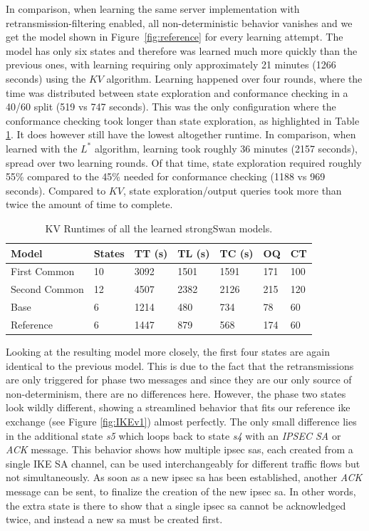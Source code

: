 In comparison, when learning the same server implementation with retransmission-filtering enabled, all non-deterministic behavior vanishes and we get the model shown in Figure~\ref{fig:reference} for every learning attempt. The model has only six states and therefore was learned much more quickly than the previous ones, with learning requiring only approximately 21 minutes (1266 seconds) using the $KV$ algorithm. Learning happened over four rounds, where the time was distributed between state exploration and conformance checking in a 40/60 split (519 vs 747 seconds). This was the only configuration where the conformance checking took longer than state exploration, as highlighted in Table \ref{tab:runtime_summary_kv}. It does however still have the lowest altogether runtime. In comparison, when learned with the $L^*$ algorithm, learning took roughly 36 minutes (2157 seconds), spread over two learning rounds. Of that time, state exploration required roughly 55\% compared to the 45\% needed for conformance checking (1188 vs 969 seconds). Compared to $KV$, state exploration/output queries took more than twice the amount of time to complete.

\begin{table}[h]
	\centering
	\begin{tabular}{|l|l|l|l|l|l|l|}
		\hline
		\rowcolor[HTML]{C0C0C0} 
		Model     		& States & TT (s)  & TL (s)  & TC (s)  & OQ  & CT  \\ \hline
		First Common 	& 10     & 3092 & 1501 & 1591 & 171 & 100 \\ \hline
		Second Common  	& 12     & 4507 & 2382 & 2126 & 215 & 120 \\ \hline
		Base      		& 6      & 1214 & 480  & 734  & 78  & 60  \\ \hline
		Reference 		& 6      & 1447 & 879  & 568  & 174 & 60  \\ \hline
	\end{tabular}
	\caption{KV Runtimes of all the learned strongSwan models.}
	\label{tab:runtime_summary_kv}
\end{table}

Looking at the resulting model more closely, the first four states are again identical to the previous model. This is due to the fact that the retransmissions are only triggered for phase two messages and since they are our only source of non-determinism, there are no differences here. However, the phase two states look wildly different, showing a streamlined behavior that fits our reference \ac{ike} exchange (see Figure \ref{fig:IKEv1}) almost perfectly. The only small difference lies in the additional state \emph{s5} which loops back to state \emph{s4} with an \emph{IPSEC SA} or \emph{ACK} message. This behavior shows how multiple \ac{ipsec} \acp{sa}, each created from a single IKE SA channel, can be used interchangeably for different traffic flows but not simultaneously. As soon as a new \ac{ipsec} \ac{sa} has been established, another \emph{ACK} message can be sent, to finalize the creation of the new \ac{ipsec} \ac{sa}. In other words, the extra state is there to show that a single \ac{ipsec} \ac{sa} cannot be acknowledged twice, and instead a new \ac{sa} must be created first. 

